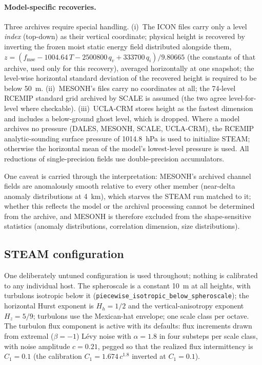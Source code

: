 \paragraph{Model-specific recoveries.} Three archives require special
handling. (i)~The ICON files carry only a level \emph{index} (top-down)
as their vertical coordinate; physical height is recovered by inverting
the frozen moist static energy field distributed alongside them,
$z = (f_{\mathrm{mse}} - 1004.64\,T - 2500800\,q_v + 333700\,q_i)/9.80665$
(the constants of that archive, used only for this recovery), averaged
horizontally at one snapshot; the level-wise horizontal standard
deviation of the recovered height is required to be below 50~m.
(ii)~MESONH's files carry no coordinates at all; the 74-level RCEMIP
standard grid archived by SCALE is assumed (the two agree level-for-level
where checkable). (iii)~UCLA-CRM stores height as the fastest dimension
and includes a below-ground ghost level, which is dropped. Where a model
archives no pressure (DALES, MESONH, SCALE, UCLA-CRM), the RCEMIP
analytic-sounding surface pressure of 1014.8~hPa is used to initialize
STEAM; otherwise the horizontal mean of the model's lowest-level pressure
is used. All reductions of single-precision fields use double-precision
accumulators.

One caveat is carried through the interpretation: MESONH's archived
channel fields are anomalously smooth relative to every other member
(near-delta anomaly distributions at 4~km), which starves the STEAM run
matched to it; whether this reflects the model or the archival processing
cannot be determined from the archive, and MESONH is therefore excluded
from the shape-sensitive statistics (anomaly distributions, correlation
dimension, size distributions).

\subsection{STEAM configuration}
\label{sect:rcemip steam config}

One deliberately untuned configuration is used throughout; nothing is
calibrated to any individual host. The spheroscale is a constant 10~m at
all heights, with turbulons isotropic below it
(\texttt{piecewise\_isotropic\_below\_spheroscale}); the horizontal Hurst
exponent is $H_h = 1/2$ and the vertical-anisotropy exponent
$H_z = 5/9$; turbulons use the Mexican-hat envelope; one scale class per
octave. The turbulon flux component is active with its defaults: flux
increments drawn from extremal ($\beta = -1$) L\'evy noise with
$\alpha = 1.8$ in four substeps per scale class, with noise amplitude
$c = 0.21$, pegged so that the realized flux intermittency is
$C_1 = 0.1$ (the calibration $C_1 = 1.674\,c^{1.8}$ inverted at
$C_1 = 0.1$).

